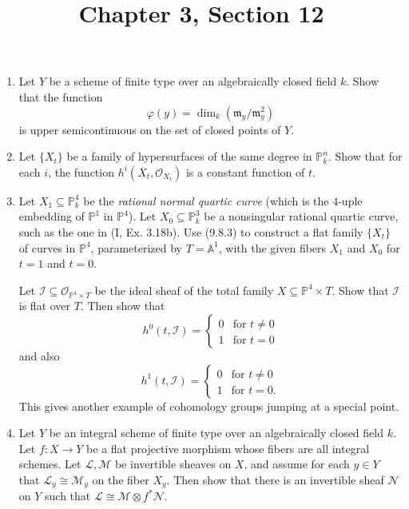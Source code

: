 \documentclass{article}
\title{Chapter 3, Section 12}
\newcommand{\goth}[1]{\mathfrak{#1}}
\newcommand{\fO}{\mathscr{O}}
\newcommand{\fL}{\mathscr{L}}
\newcommand{\fM}{\mathscr{M}}
\newcommand{\fI}{\mathscr{I}}
\newcommand{\fN}{\mathscr{N}}
\newcommand{\PP}{\mathbb{P}}
\newcommand{\A}{\mathbb{A}}
\begin{document}
\maketitle
\begin{enumerate} [label=\textbf{\arabic*.}, leftmargin=0em]

\item Let $Y$ be a scheme of finite type over an algebraically closed field $k$. Show that the function
\begin{equation*}
  \varphi(y) = \dim_k(\goth{m}_y/\goth{m}_y^2)
\end{equation*}
is upper semicontinuous on the set of closed points of $Y$.

\item Let $\{X_t \}$ be a family of hypersurfaces of the same degree in $\PP_k^n$. Show that for each $i$, the function $h^i(X_t, \fO_{X_t})$ is a constant function of $t$.

\item Let $X_1 \subseteq \PP_k^4$ be the \textit{rational normal quartic curve} (which is the $4$-uple embedding of $\PP^1$ in $\PP^4$). Let $X_0 \subseteq \PP_k^3$ be a nonsingular rational quartic curve, such as the one in (I, Ex. 3.18b). Use (9.8.3) to construct a flat family $\{X_t\}$ of curves in $\PP^4$, parameterized by $T = \A^1$, with the given fibers $X_1$ and $X_0$ for $t = 1$ and $t = 0$.

Let $\fI \subseteq \fO_{\PP^4 \times T}$ be the ideal sheaf of the total family $X \subseteq \PP^4 \times T$. Show that $\fI$ is flat over $T$. Then show that
\begin{equation*}
  h^0(t, \fI) = \begin{cases}
    0 & \text{for $t \neq 0$} \\
    1 & \text{for $t = 0$}
  \end{cases}
\end{equation*}
and also
\begin{equation*}
  h^1(t, \fI) = \begin{cases}
    0 & \text{for $t \neq 0$} \\
    1 & \text{for $t = 0$.}
  \end{cases}
\end{equation*}
This gives another example of cohomology groups jumping at a special point.

\item Let $Y$ be an integral scheme of finite type over an algebraically closed field $k$. Let $f : X \to Y$ be a flat projective morphism whose fibers are all integral schemes. Let $\fL, \fM$ be invertible sheaves on $X$, and assume for each $y \in Y$ that $\fL_y \cong \fM_y$ on the fiber $X_y$. Then show that there is an invertible sheaf $\fN$ on $Y$ such that $\fL \cong \fM \otimes f^* \fN$.


\end{enumerate}
\end{document}

